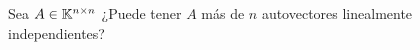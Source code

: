 \item Sea $A\in\mathbb{K}^{n\times n}$ ¿Puede tener $A$ más de $n$ autovectores linealmente independientes?
    \begin{mdframed}[style=s]
        
    \end{mdframed}